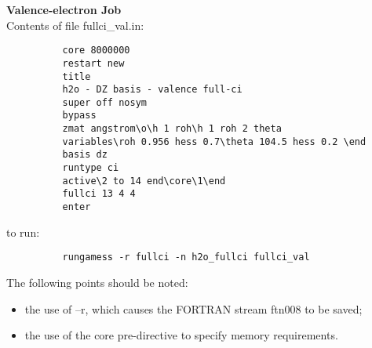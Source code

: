 \documentclass[11pt,fleqn]{article}
\begin{document}
{\bf Valence-electron Job}\\

Contents of file fullci\_val.in:
{
\footnotesize
\begin{verbatim}
          core 8000000
          restart new
          title
          h2o - DZ basis - valence full-ci
          super off nosym
          bypass
          zmat angstrom\o\h 1 roh\h 1 roh 2 theta
          variables\roh 0.956 hess 0.7\theta 104.5 hess 0.2 \end
          basis dz
          runtype ci
          active\2 to 14 end\core\1\end
          fullci 13 4 4
          enter
\end{verbatim}
}
to run:
{
\footnotesize
\begin{verbatim}
          rungamess -r fullci -n h2o_fullci fullci_val
\end{verbatim}
}

The following points should be noted:
\begin{itemize}
\item the use of --r, which causes the FORTRAN stream ftn008 to be saved;
\item the use of the core pre-directive to specify
memory requirements.
\end{itemize}
\end{document}
